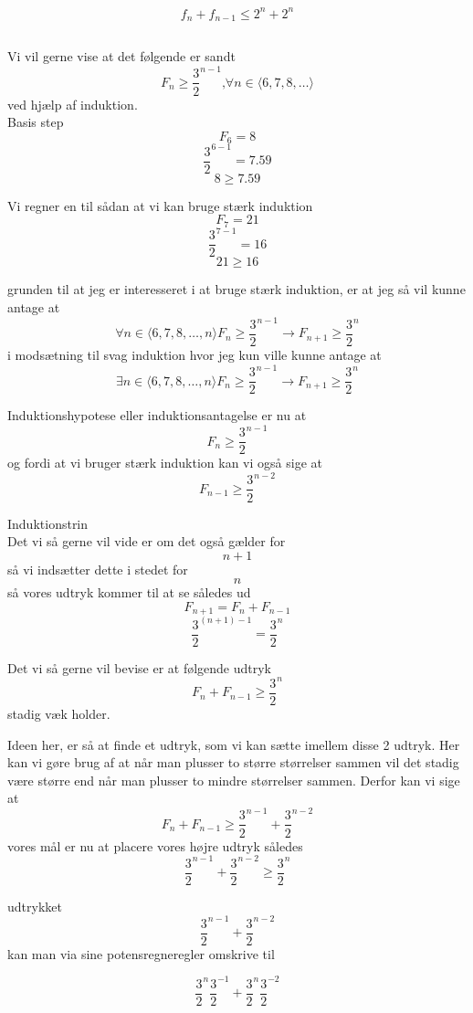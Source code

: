 \documentclass[12pt, a4paper, hidelinks]{article}
\begin{document}
$$ f_{n} + f_{n-1} \leq 2^{n} + 2^{n} $$

\subsection{}
Vi vil gerne vise at det følgende er sandt
$$ F_{n} \geq \frac{3}{2}^{n-1} \text{,} \forall n \in \langle 6, 7, 8, \ldots \rangle    $$
ved hjælp af induktion.\\

Basis step 
$$ F_{6} = 8 $$
$$ \frac{3}{2}^{6-1} = 7.59 $$
$$ 8 \geq 7.59 $$

Vi regner en til sådan at vi kan bruge stærk induktion
$$ F_{7} = 21 $$
$$ \frac{3}{2}^{7-1} = 16 $$
$$ 21 \geq 16 $$

grunden til at jeg er interesseret i at bruge stærk induktion, er at jeg så vil kunne antage at 
$$ \forall n \in \langle 6, 7, 8, \ldots , n \rangle F_{n} \geq \frac{3}{2}^{n-1} \rightarrow F_{n+1} \geq \frac{3}{2}^{n}    $$
i modsætning til svag induktion hvor jeg kun ville kunne antage at 
$$ \exists{n} \in \langle 6,7,8, \ldots , n \rangle F_{n} \geq \frac{3}{2}^{n-1} \rightarrow F_{n+1} \geq \frac{3}{2}^{n}  $$ 

Induktionshypotese eller induktionsantagelse er nu at   $$ F_{n} \geq \frac{3}{2}^{n-1} $$ og fordi at vi bruger stærk induktion
kan vi også sige at $$ F_{n-1} \geq \frac{3}{2}^{n-2} $$ 

Induktionstrin\\
Det vi så gerne vil vide er om det også gælder for $$ n+1 $$ så
vi indsætter dette i stedet for $$ n $$ så vores udtryk kommer til at se således ud
$$ F_{n+1} = F_{n} + F_{n-1} $$
$$ \frac{3}{2}^{(n+1)-1} = \frac{3}{2}^{n} $$

Det vi så gerne vil bevise er at følgende udtryk 
$$ F_{n} + F_{n-1} \geq \frac{3}{2}^{n} $$ 
stadig væk holder.

Ideen her, er så at finde et udtryk, som vi kan sætte imellem disse 2 udtryk. 
Her kan vi gøre brug af at når man plusser to større størrelser sammen vil det stadig være 
større end når man plusser to mindre størrelser sammen. Derfor kan vi sige at
$$ F_{n} + F_{n-1} \geq \frac{3}{2}^{n-1} + \frac{3}{2}^{n-2} $$ vores mål er nu at placere vores 
højre udtryk således $$  \frac{3}{2}^{n-1} + \frac{3}{2}^{n-2} \geq  \frac{3}{2}^{n} $$

udtrykket
$$  \frac{3}{2}^{n-1} + \frac{3}{2}^{n-2} $$ 
kan man via sine potensregneregler omskrive til

$$ \frac{3}{2}^{n} \frac{3}{2}^{-1} +  \frac{3}{2}^{n} \frac{3}{2}^{-2} $$
\end{document}

